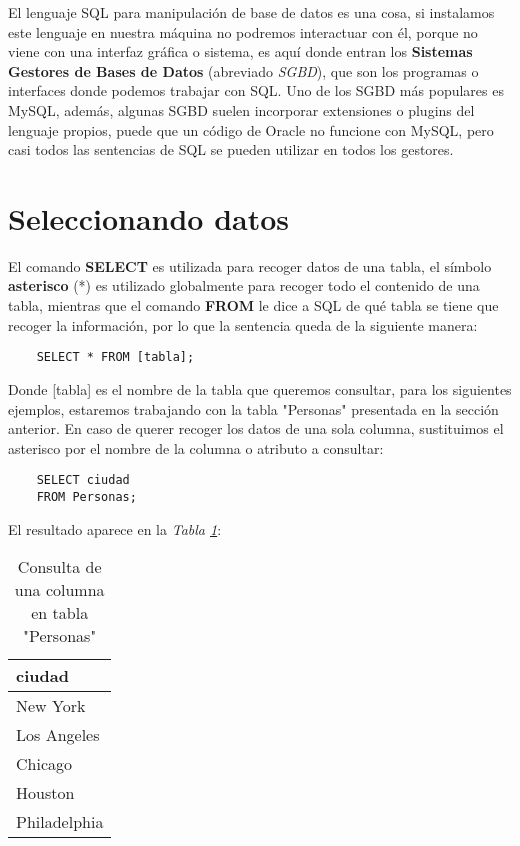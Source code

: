 El lenguaje SQL para manipulación de base de datos es una cosa, si instalamos este lenguaje en nuestra máquina no podremos interactuar con él, porque no viene con una interfaz gráfica o sistema, es aquí donde entran los \textbf{Sistemas Gestores de Bases de Datos} (abreviado \textit{SGBD}), que son los programas o interfaces donde podemos trabajar con SQL. Uno de los SGBD más populares es MySQL, además, algunas SGBD suelen incorporar extensiones o plugins del lenguaje propios, puede que un código de Oracle no funcione con MySQL, pero casi todos las sentencias de SQL se pueden utilizar en todos los gestores.



\section{Seleccionando datos}

El comando \textbf{SELECT} es utilizada para recoger datos de una tabla, el símbolo \textbf{asterisco} (*) es utilizado globalmente para recoger todo el contenido de una tabla, mientras que el comando \textbf{FROM} le dice a SQL de qué tabla se tiene que recoger la información, por lo que la sentencia queda de la siguiente manera:
\begin{lstlisting}
    SELECT * FROM [tabla];
\end{lstlisting}

Donde [tabla] es el nombre de la tabla que queremos consultar, para los siguientes ejemplos, estaremos trabajando con la tabla "Personas" presentada en la sección anterior. En caso de querer recoger los datos de una sola columna, sustituimos el asterisco por el nombre de la columna o atributo a consultar:
\begin{lstlisting}
    SELECT ciudad
    FROM Personas;
\end{lstlisting}

El resultado aparece en la \textit{Tabla \ref{tab: 2}}:
\begin{table}[H]
    \centering
    \caption{Consulta de una columna en tabla "Personas"}
    \label{tab: 2}
    \begin{tabular}{|l|}
        \hline
        \textbf{ciudad} \\
        \hline
        New York \\
        \hline
        Los Angeles \\
        \hline
        Chicago \\
        \hline
        Houston \\
        \hline
        Philadelphia \\
        \hline
    \end{tabular}
\end{table}

